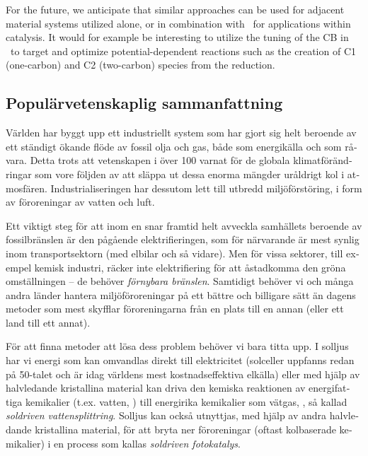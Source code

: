 \documentclass[draft,webedition,openright,titles,swedish,english]{LuaUUThesis}\usepackage[]{graphicx}\usepackage[]{xcolor}
\begin{document}
For the future, we anticipate that similar approaches can be used for adjacent
material systems utilized alone, or in combination with \ZnO\ for applications
within catalysis.
It would for example be interesting to utilize the tuning of
the \gls{CB} in \ZnO\ to target and optimize potential-dependent reactions
such as the creation of C1 (one-carbon) and C2 (two-carbon) species from the  reduction.






\begin{otherlanguage}{swedish}
\chapter{Populärvetenskaplig sammanfattning}
\label{ch:sammanfattning}

%

Världen har byggt upp ett industriellt system som har gjort sig helt
beroende av ett ständigt ökande flöde av fossil olja och gas, både som
energikälla och som råvara.
Detta trots att vetenskapen i över \qty{100}{\yearswe} varnat för de globala
klimatförändringar som vore följden av att släppa ut dessa enorma mängder
uråldrigt kol i atmosfären.
Industrialiseringen har dessutom lett till utbredd miljöförstöring, i form av
föroreningar av vatten och luft.

Ett viktigt steg för att inom en snar framtid helt avveckla
samhällets beroende av fossilbränslen är den pågående elektrifieringen,
som för närvarande är mest synlig inom transportsektorn (med elbilar och så vidare).
Men för vissa sektorer, till exempel kemisk industri,
räcker inte elektrifiering för att åstadkomma den gröna omställningen --
de behöver \emph{förnybara bränslen}.
Samtidigt behöver vi och många andra länder hantera miljöföroreningar på ett bättre
och billigare sätt än dagens metoder som mest skyfflar föroreningarna från
en plats till en annan (eller ett land till ett annat).

För att finna metoder att lösa dess problem behöver vi bara titta upp.
I solljus har vi energi som kan omvandlas direkt till elektricitet
(solceller uppfanns redan på 50-talet och är idag världens mest kostnadseffektiva elkälla)
eller med hjälp av halvledande kristallina material kan driva den kemiska
reaktionen av energifattiga kemikalier (t.ex. vatten, \water) till
energirika kemikalier som vätgas, \hydrogen, så kallad \emph{soldriven vattensplittring}.
Solljus kan också utnyttjas, med hjälp av andra halvledande kristallina material,
för att bryta ner föroreningar (oftast kolbaserade kemikalier) i en process
som kallas \emph{soldriven fotokatalys}.


\end{otherlanguage}
\end{document}
